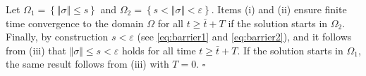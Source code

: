 \documentclass[twocolumn]{autart}    %
\begin{document}
\begin{pf}
\begin{itemize}
\end{itemize} Let $\Omega_1\!=\!\left \lbrace \Vert \sigma\Vert\leq s \right \rbrace$ and $\Omega_2\!=\!\left \lbrace s<\Vert \sigma\Vert< \varepsilon \right \rbrace$. Items (i) and (ii) ensure finite time convergence to the domain $\Omega$ for all $t\geq \bar{t}+T$ if the solution starts in $\Omega_2$. Finally, by construction $s<\varepsilon$ (see \eqref{eq:barrier1} and \eqref{eq:barrier2}), and it follows from (iii) that $\Vert \sigma \Vert \leq s < \varepsilon$ holds for all time $t\geq \bar{t}+T$. If the solution starts in $\Omega_1$, the same result follows from (iii) with $T=0$. \hfill $\square$
\end{pf}
\end{document}
